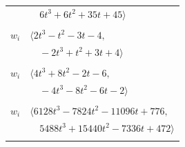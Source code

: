 \documentclass[11pt]{article}
\begin{document}
\begin{longtable}{@{}ll@{}}
 & $\quad 6t^{3}+6t^{2}+35t+45\rangle$\\
\addlinespace[2pt]
\multicolumn{2}{@{}p{0.97\textwidth}@{}}{$i=44$, $D_i=1$, $\rho_{ij}$: $4{:}2, \allowbreak 11{:}1, \allowbreak 15{:}3, \allowbreak 16{:}3, \allowbreak 22{:}3, \allowbreak 24{:}2, \allowbreak 25{:}1, \allowbreak 26{:}3$}\\
$w_i$ & $\langle 2t^{3}-t^{2}-3t-4,$\\
 & $\quad -2t^{3}+t^{2}+3t+4\rangle$\\
\addlinespace[2pt]
\multicolumn{2}{@{}p{0.97\textwidth}@{}}{$i=45$, $D_i=1$, $\rho_{ij}$: $6{:}2, \allowbreak 11{:}1, \allowbreak 16{:}1, \allowbreak 27{:}3, \allowbreak 39{:}1, \allowbreak 43{:}3$}\\
$w_i$ & $\langle 4t^{3}+8t^{2}-2t-6,$\\
 & $\quad -4t^{3}-8t^{2}-6t-2\rangle$\\
\addlinespace[2pt]
\multicolumn{2}{@{}p{0.97\textwidth}@{}}{$i=46$, $D_i=2$, $e_i=2$, $\rho_{ij}$: $1{:}1, \allowbreak 6{:}2, \allowbreak 7{:}3, \allowbreak 10{:}2, \allowbreak 13{:}3, \allowbreak 20{:}1, \allowbreak 24{:}2, \allowbreak 28{:}3, \allowbreak 33{:}2, \allowbreak 35{:}2, \allowbreak 38{:}1, \allowbreak 40{:}2$}\\
$w_i$ & $\langle 6128t^{3}-7824t^{2}-11096t+776,$\\
 & $\quad 5488t^{3}+15440t^{2}-7336t+472\rangle$\\
\addlinespace[2pt]
\end{longtable}
\endgroup
\end{document}
